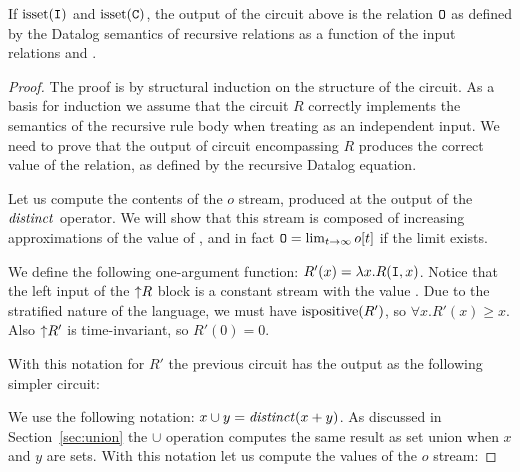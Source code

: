 \begin{theorem}
If $\mbox{isset}(\mbox{\texttt{I}})$ and $\mbox{isset}(\mbox{\texttt{C}})$, the output of the circuit above is
the relation $\mbox{\texttt{O}}$ as defined by the Datalog semantics of recursive relations
as a function of the input relations  and .
\end{theorem}

\begin{proof}
The proof is by structural induction on the structure of the circuit.
As a basis for induction we assume that the circuit $R$ correctly implements
the semantics of the recursive rule body when treating  as an
independent input.  We need to prove that the output of circuit encompassing
$R$ produces the correct value of the  relation, as defined by
the recursive Datalog equation.

Let us compute the contents of the $o$ stream, produced at the output
of the $\mathit{distinct}$ operator.  We will show that this stream is composed
of increasing approximations of the value of , and in fact
$\mbox{\texttt{O}} = \lim_{t \to \infty} o[t]$ if the limit exists.

We define the following one-argument function: $R'(x) = \lambda x . R(\mbox{\texttt{I}}, x)$.
Notice that the left input of the ${\uparrow}R$ block is a constant stream
with the value .  Due to the stratified nature of the language,
we must have $\mbox{ispositive}(R')$, so $\forall x . R'(x) \geq x$.
Also ${\uparrow}R'$ is time-invariant, so $R'(0) = 0$.

With this notation for $R'$ the previous circuit has the
output as the following simpler circuit:

\begin{center}
\end{center}

We use the following notation: $x \cup y = \mathit{distinct}(x + y)$.  As discussed in Section~\ref{sec:union}
the $\cup$ operation computes the same result as set union when $x$ and $y$ are sets.
With this notation let us compute the values of the $o$ stream:


\end{proof}

